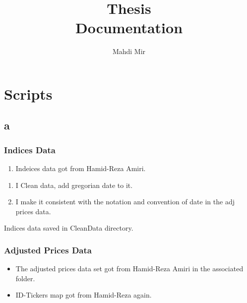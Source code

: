 \documentclass[12pt]{article}
\title{Thesis \\ Documentation}
\author{Mahdi Mir}
\begin{document}



\maketitle
\tableofcontents


\section{Scripts}
\subsection{a}
\subsubsection{Indices Data}

\begin{enumerate}
	\item Indeices data got from Hamid-Reza Amiri. %
\end{enumerate}

\begin{enumerate}
	\item I Clean data, add gregorian date to it.
	\item I make it consistent with the notation and convention of date in the adj prices data.
\end{enumerate}

Indices data saved in CleanData directory.

\subsubsection{Adjusted Prices Data}

\begin{itemize}
	\item The adjusted prices data set got from Hamid-Reza Amiri in the associated folder. %
	\item ID-Tickers map got from Hamid-Reza again.
\end{itemize}
\end{document}
